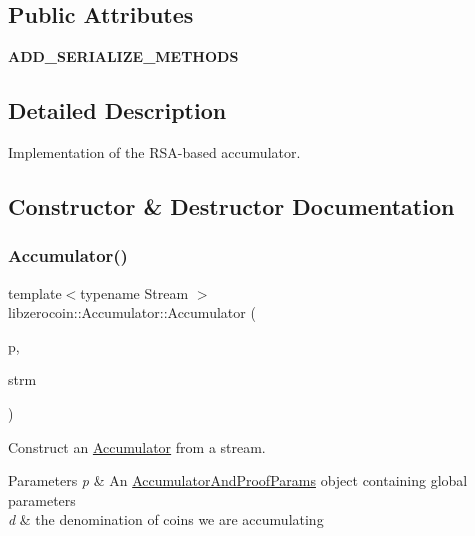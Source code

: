 \subsection*{Public Attributes}
\begin{DoxyCompactItemize}
\item 
\mbox{\label{classlibzerocoin_1_1_accumulator_ad90a9cdbbd70d2940dd61a85803b6d98}} 
{\bfseries A\+D\+D\+\_\+\+S\+E\+R\+I\+A\+L\+I\+Z\+E\+\_\+\+M\+E\+T\+H\+O\+DS}
\end{DoxyCompactItemize}


\subsection{Detailed Description}
Implementation of the R\+S\+A-\/based accumulator. 

\subsection{Constructor \& Destructor Documentation}
\mbox{\label{classlibzerocoin_1_1_accumulator_a215f60913d092b292e753b83da226723}} 
\subsubsection{\texorpdfstring{Accumulator()}{Accumulator()}\hspace{0.1cm}{\footnotesize\ttfamily [1/2]}}
{\footnotesize\ttfamily template$<$typename Stream $>$ \\
libzerocoin\+::\+Accumulator\+::\+Accumulator (\begin{DoxyParamCaption}\item[{const \mbox{\hyperlink{classlibzerocoin_1_1_accumulator_and_proof_params}{Accumulator\+And\+Proof\+Params}} $\ast$}]{p,  }\item[{Stream \&}]{strm }\end{DoxyParamCaption})\hspace{0.3cm}{\ttfamily [inline]}}



Construct an \mbox{\hyperlink{classlibzerocoin_1_1_accumulator}{Accumulator}} from a stream. 


\begin{DoxyParams}{Parameters}
{\em p} & An \mbox{\hyperlink{classlibzerocoin_1_1_accumulator_and_proof_params}{Accumulator\+And\+Proof\+Params}} object containing global parameters \\
\hline
{\em d} & the denomination of coins we are accumulating \\
\hline
\end{DoxyParams}

